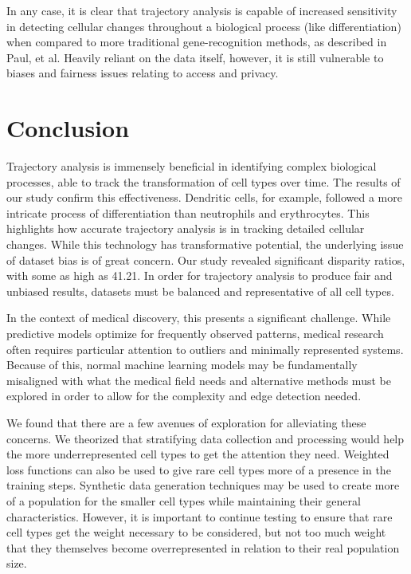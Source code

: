 \documentclass{article}
\begin{document}
In any case, it is clear that trajectory analysis is capable of increased sensitivity in detecting cellular changes throughout a biological process (like differentiation) when compared to more traditional gene-recognition methods, as described in Paul, et al. Heavily reliant on the data itself, however, it is still vulnerable to biases and fairness issues relating to access and privacy.


\section{Conclusion}
Trajectory analysis is immensely beneficial in identifying complex biological processes, able to track the transformation of cell types over time.  The results of our study confirm this effectiveness.  Dendritic cells, for example, followed a more intricate process of differentiation than neutrophils and erythrocytes.  This highlights how accurate trajectory analysis is in tracking detailed cellular changes.  While this technology has transformative potential, the underlying issue of dataset bias is of great concern.  Our study revealed significant disparity ratios, with some as high as 41.21.  In order for trajectory analysis to produce fair and unbiased results, datasets must be balanced and representative of all cell types.

In the context of medical discovery, this presents a significant challenge. While predictive models optimize for frequently observed patterns, medical research often requires particular attention to outliers and minimally represented systems. Because of this, normal machine learning models may be fundamentally misaligned with what the medical field needs and alternative methods must be explored in order to allow for the complexity and edge detection needed.

We found that there are a few avenues of exploration for alleviating these concerns. We theorized that stratifying data collection and processing would help the more underrepresented cell types to get the attention they need. Weighted loss functions can also be used to give rare cell types more of a presence in the training steps. Synthetic data generation techniques may be used to create more of a population for the smaller cell types while maintaining their general characteristics. However, it is important to continue testing to ensure that rare cell types get the weight necessary to be considered, but not too much weight that they themselves become overrepresented in relation to their real population size. 
\end{document}
